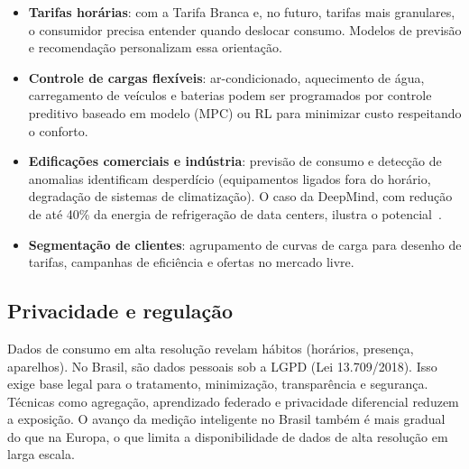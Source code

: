 \documentclass[10pt,a4paper,oneside]{article}
\begin{document}
\begin{itemize}
  \item \textbf{Tarifas horárias}: com a Tarifa Branca e, no futuro, tarifas
    mais granulares, o consumidor precisa entender quando deslocar consumo.
    Modelos de previsão e recomendação personalizam essa orientação.
  \item \textbf{Controle de cargas flexíveis}: ar-condicionado, aquecimento de
    água, carregamento de veículos e baterias podem ser programados por
    controle preditivo baseado em modelo (MPC) ou RL para minimizar custo
    respeitando o conforto.
  \item \textbf{Edificações comerciais e indústria}: previsão de consumo e
    detecção de anomalias identificam desperdício (equipamentos ligados fora
    do horário, degradação de sistemas de climatização). O caso da DeepMind,
    com redução de até 40\% da energia de refrigeração de data centers,
    ilustra o potencial~\cite{deepmindcooling}.
  \item \textbf{Segmentação de clientes}: agrupamento de curvas de carga para
    desenho de tarifas, campanhas de eficiência e ofertas no mercado livre.
\end{itemize}

\subsection{Privacidade e regulação}

Dados de consumo em alta resolução revelam hábitos (horários, presença,
aparelhos). No Brasil, são dados pessoais sob a LGPD (Lei 13.709/2018).
Isso exige base legal para o tratamento, minimização, transparência e
segurança. Técnicas como agregação, aprendizado federado e privacidade
diferencial reduzem a exposição. O avanço da medição inteligente no Brasil
também é mais gradual do que na Europa, o que limita a disponibilidade de
dados de alta resolução em larga escala.
\end{document}
